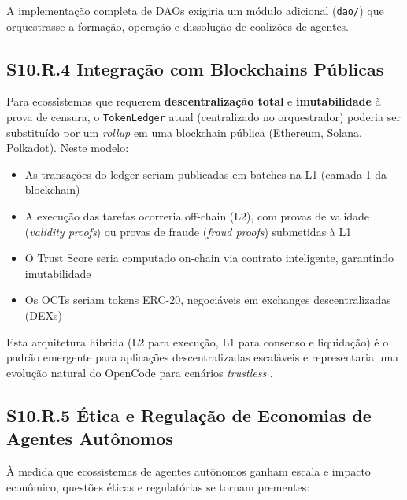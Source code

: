 A implementação completa de DAOs exigiria um módulo adicional (\texttt{dao/}) que orquestrasse a formação, operação e dissolução de coalizões de agentes.

\subsection*{S10.R.4 Integração com Blockchains Públicas}

Para ecossistemas que requerem \textbf{descentralização total} e \textbf{imutabilidade} à prova de censura, o \texttt{TokenLedger} atual (centralizado no orquestrador) poderia ser substituído por um \textit{rollup} em uma blockchain pública (Ethereum, Solana, Polkadot). Neste modelo:

\begin{itemize}
    \item As transações do ledger seriam publicadas em batches na L1 (camada 1 da blockchain)
    \item A execução das tarefas ocorreria off-chain (L2), com provas de validade (\textit{validity proofs}) ou provas de fraude (\textit{fraud proofs}) submetidas à L1
    \item O Trust Score seria computado on-chain via contrato inteligente, garantindo imutabilidade
    \item Os OCTs seriam tokens ERC-20, negociáveis em exchanges descentralizadas (DEXs)
\end{itemize}

Esta arquitetura híbrida (L2 para execução, L1 para consenso e liquidação) é o padrão emergente para aplicações descentralizadas escaláveis e representaria uma evolução natural do OpenCode para cenários \textit{trustless} \cite{buterin2021rollups}.

\subsection*{S10.R.5 Ética e Regulação de Economias de Agentes Autônomos}

À medida que ecossistemas de agentes autônomos ganham escala e impacto econômico, questões éticas e regulatórias se tornam prementes:

